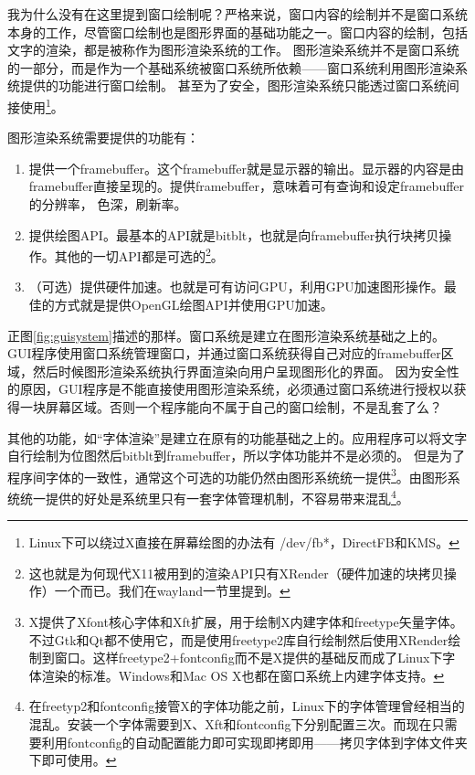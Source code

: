 我为什么没有在这里提到窗口绘制呢？严格来说，窗口内容的绘制并不是窗口系统本身的工作，尽管窗口绘制也是图形界面的基础功能之一。窗口内容的绘制，包括文字的渲染，都是被称作为图形渲染系统的工作。
图形渲染系统并不是窗口系统的一部分，而是作为一个基础系统被窗口系统所依赖——窗口系统利用图形渲染系统提供的功能进行窗口绘制。
甚至为了安全，图形渲染系统只能透过窗口系统间接使用\footnote{Linux下可以绕过X直接在屏幕绘图的办法有
/dev/fb*，DirectFB和KMS。}。

图形渲染系统需要提供的功能有：
\begin{enumerate}
\item	提供一个framebuffer。这个framebuffer就是显示器的输出。显示器的内容是由framebuffer直接呈现的。提供framebuffer，意味着可有查询和设定framebuffer的分辨率，
色深，刷新率。

\item	提供绘图API。最基本的API就是bitblt，也就是向framebuffer执行块拷贝操作。其他的一切API都是可选的\footnote{这也就是为何现代X11被用到的渲染API只有XRender（硬件加速的块拷贝操作）一个而已。我们在wayland一节里提到。}。

\item	（可选）提供硬件加速。也就是可有访问GPU，利用GPU加速图形操作。最佳的方式就是提供OpenGL绘图API并使用GPU加速。
\end{enumerate}

正图\ref{fig:guisystem}描述的那样。窗口系统是建立在图形渲染系统基础之上的。
GUI程序使用窗口系统管理窗口，并通过窗口系统获得自己对应的framebuffer区域，然后时候图形渲染系统执行界面渲染向用户呈现图形化的界面。
因为安全性的原因，GUI程序是不能直接使用图形渲染系统，必须通过窗口系统进行授权以获得一块屏幕区域。否则一个程序能向不属于自己的窗口绘制，不是乱套了么？


其他的功能，如“字体渲染”是建立在原有的功能基础之上的。应用程序可以将文字自行绘制为位图然后bitblt到framebuffer，所以字体功能并不是必须的。
但是为了程序间字体的一致性，通常这个可选的功能仍然由图形系统统一提供\footnote{X提供了Xfont核心字体和Xft扩展，用于绘制X内建字体和freetype矢量字体。不过Gtk和Qt都不使用它，而是使用freetype2库自行绘制然后使用XRender绘制到窗口。这样freetype2+fontconfig而不是X提供的基础反而成了Linux下字体渲染的标准。Windows{}和{}Mac OS X{}也都在窗口系统上内建字体支持。}。由图形系统统一提供的好处是系统里只有一套字体管理机制，不容易带来混乱\footnote{在freetyp2和fontconfig接管X的字体功能之前，Linux下的字体管理曾经相当的混乱。安装一个字体需要到X、Xft和fontconfig下分别配置三次。而现在只需要利用fontconfig的自动配置能力即可实现即拷即用——拷贝字体到字体文件夹下即可使用。}。

